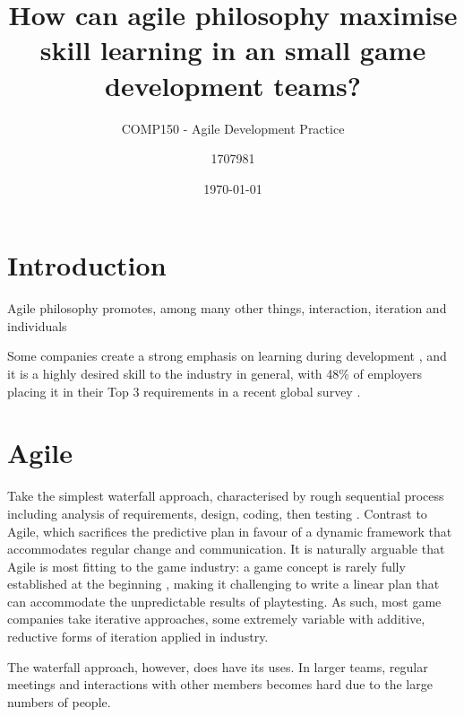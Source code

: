 \documentclass{scrartcl}
\title{How can agile philosophy maximise skill learning in an small game development teams?}
\subtitle{COMP150 - Agile Development Practice}
\date{\today}
\author{1707981}
\begin{document}
\maketitle
{}


\section{Introduction}
Agile philosophy promotes, among many other things, interaction, iteration and individuals \cite{manifesto, agile}

Some companies create a strong emphasis on learning during development \cite{collaboration}, and it is a highly desired skill to the industry in general, with 48\% of employers placing it in their Top 3 requirements in a recent global survey \cite{devstudy}.

\section{Agile}
Take the simplest waterfall approach, characterised by rough sequential process including analysis of requirements, design, coding, then testing \cite{waterfall, olddays}. Contrast to Agile, which sacrifices the predictive plan in favour of a dynamic framework that accommodates regular change and communication. \cite{manifesto, agile} It is naturally arguable that Agile is most fitting to the game industry: a game concept is rarely fully established at the beginning \cite{collaboration}, making it challenging to write a linear plan that can accommodate the unpredictable results of playtesting. As such, most game companies take iterative approaches, some extremely variable with additive, reductive forms of iteration \cite{iteration} applied in industry.

The waterfall approach, however, does have its uses. In larger teams, regular meetings and interactions with other members becomes hard due to the large numbers of people. 
\end{document}
